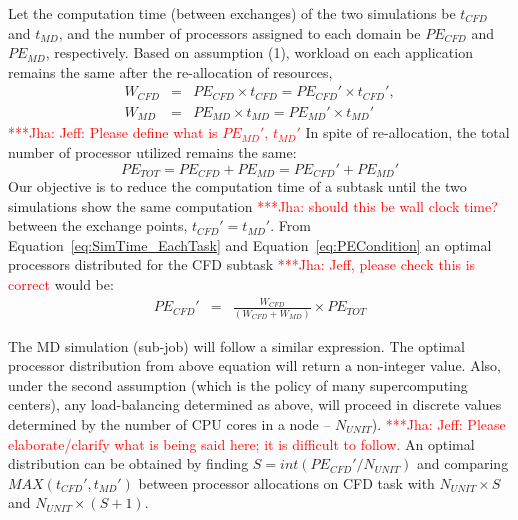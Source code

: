 \documentclass[conference,final]{IEEEtran}
\newcommand{\jhanote}[1]{ {\textcolor{red} { ***Jha: #1 }}}
\newcommand{\jhanote}[1]{}
\begin{document}
Let the computation time (between exchanges) of the two simulations
be $t_{CFD}$ and $t_{MD}$, and the number of processors assigned to
each domain be $PE_{CFD}$ and $PE_{MD}$, respectively. Based on
assumption (1), workload on each application remains the same after
the re-allocation of resources, \begin{eqnarray}
W_{CFD} &=& PE_{CFD} \times t_{CFD} = PE_{CFD}' \times t_{CFD}', \nonumber \\
W_{MD} &=& PE_{MD} \times t_{MD} = PE_{MD}' \times t_{MD}'
\label{eq:SimTime_EachTask}
\end{eqnarray}
\jhanote{Jeff: Please define what is $PE_{MD}'$, $t_{MD}'$} In spite
of re-allocation, the total number of processor utilized remains the
same:
\begin{equation}
PE_{TOT} = PE_{CFD} + PE_{MD} = PE_{CFD}' + PE_{MD}'
\label{eq:PECondition}
\end{equation}
Our objective is to reduce the computation time of a subtask until the
two simulations show the same computation \jhanote{should this be wall
  clock time?} between the exchange points, $t_{CFD}' = t_{MD}'$. From
Equation~\ref{eq:SimTime_EachTask} and Equation~\ref{eq:PECondition}
an optimal processors distributed for the CFD subtask \jhanote{Jeff,
  please check this is correct} would be:
\begin{eqnarray}
PE_{CFD}' & = & \frac {W_{CFD}} {(W_{CFD} + W_{MD})} \times PE_{TOT}
\end{eqnarray}

The MD simulation (sub-job) will follow a similar expression. The
optimal processor distribution from above equation will return a
non-integer value. Also, under the second assumption (which is the
policy of many supercomputing centers), any load-balancing determined
as above, will proceed in discrete values determined by the number of
CPU cores in a node -- $N_{UNIT}$).  \jhanote{Jeff: Please
  elaborate/clarify what is being said here; it is difficult to
  follow.} An optimal distribution can be obtained by finding $S =
int(PE_{CFD}' / N_{UNIT})$ and comparing $MAX(t_{CFD}',t_{MD}')$
between processor allocations on CFD task with $N_{UNIT} \times S$ and
$N_{UNIT} \times (S+1)$.

\end{document}
